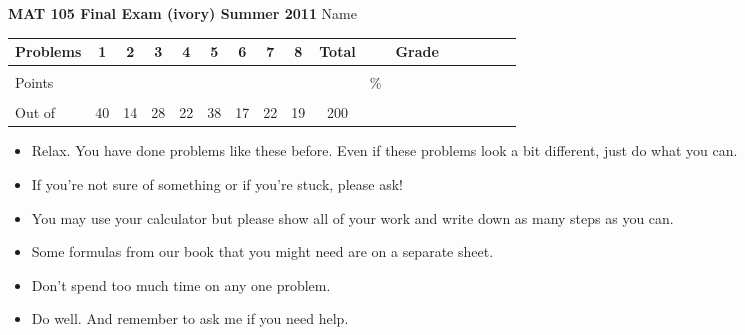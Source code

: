 \documentclass[12pt]{article}
\begin{document}
{\bf MAT 105 Final Exam (ivory) Summer 2011} \hspace{.4in} {\large Name} \hrulefill

\hspace{.2in}

\begin{center}

\begin{tabular}
{|l|c|c|c|c|c|c|c|c|c|c|c|c|c|c|c|c|} \hline

 Problems & \hspace{5 pt} 1 \hspace{5 pt}  & \hspace{5 pt} 2 \hspace{5 pt} & \hspace{5 pt} 3 \hspace{5 pt} & \hspace{5 pt} 4 \hspace{5 pt}& \hspace{5 pt} 5 \hspace{5 pt} & \hspace{5 pt} 6 \hspace{5 pt} & \hspace{5 pt} 7 \hspace{5 pt}   & \hspace{5 pt} 8 \hspace{5 pt} &  \hspace{5 pt} Total  \hspace{5 pt} & &  \hspace{5 pt} Grade \hspace{5 pt}  \\ \hline
&&&&&&&&&&&\\  
Points &&&&&&&&&&   \hspace{.6in}\% &  \\ 
&&&&&&&&&&& \\  \hline
Out of & 40  & 14 & 28 & 22 & 38 & 17 & 22 & 19 &200 & & \\ \hline

\end {tabular}
 
\end{center}

\hspace{.2in}

\begin{itemize}
\item Relax.  You have done problems like these before. Even if these problems look a bit different, just do what you can. 
\item  If you're not sure of something or if you're stuck, please ask! 
\item You may use your calculator but please show all of your work and write down as many steps as you can.  
\item Some formulas from our book that you might need are on a separate sheet.
\item Don't spend too much time on any one problem.
\item  Do well.  And remember to ask me if you need help.
\end{itemize}
\end{document}
